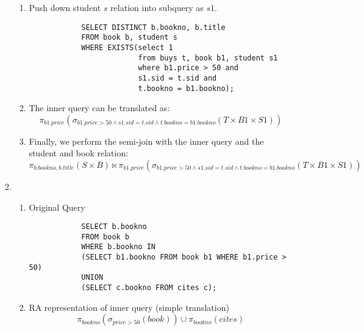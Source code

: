 \documentclass{article}
\begin{document}
\begin{enumerate}
\begin{enumerate}
\begin{enumerate}
            \item Push down student $s$ relation into subquery as $s1$.
            \begin{lstlisting}
            SELECT DISTINCT b.bookno, b.title
            FROM book b, student s
            WHERE EXISTS(select 1
                         from buys t, book b1, student s1
                         where b1.price > 50 and
                         s1.sid = t.sid and
                         t.bookno = b1.bookno);
            \end{lstlisting}

            \item The inner query can be translated as:
            \begin{displaymath}
                \pi_{b1.price}(
                    \sigma_{b1.price>50 \wedge s1.sid=t.sid \wedge t.bookno=b1.bookno}(T \times B1 \times S1
                    ))
            \end{displaymath}

            \item Finally, we perform the semi-join with the inner query and the student and book relation:
            \begin{displaymath}
                \pi_{b.bookno, b.title}(S \times B) \ltimes
                \pi_{b1.price}(
                    \sigma_{b1.price>50 \wedge s1.sid=t.sid \wedge t.bookno=b1.bookno}(T \times B1 \times S1
                    ))
            \end{displaymath}

        \end{enumerate}

        \item %

        \begin{enumerate}
            \item Original Query
            \begin{lstlisting}
            SELECT b.bookno
            FROM book b
            WHERE b.bookno IN
            (SELECT b1.bookno FROM book b1 WHERE b1.price > 50)
            UNION
            (SELECT c.bookno FROM cites c);
            \end{lstlisting}

            \item RA representation of inner query (simple translation)
            \begin{displaymath}
                \pi_{bookno}(\sigma_{price > 50}(book)) \cup \pi_{bookno}(cites)
            \end{displaymath}


\end{enumerate}
\end{enumerate}
\end{enumerate}
\end{document}
